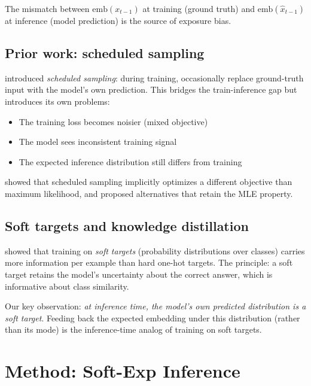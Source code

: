 \documentclass{article}
\begin{document}
The mismatch between $\mathrm{emb}(x_{t-1})$ at training (ground truth) and $\mathrm{emb}(\hat{x}_{t-1})$ at inference (model prediction) is the source of exposure bias.

\subsection{Prior work: scheduled sampling}

\citet{bengio2015scheduled} introduced \emph{scheduled sampling}: during training, occasionally replace ground-truth input with the model's own prediction. This bridges the train-inference gap but introduces its own problems:
\begin{itemize}
    \item The training loss becomes noisier (mixed objective)
    \item The model sees inconsistent training signal
    \item The expected inference distribution still differs from training
\end{itemize}

\citet{huszar2015how} showed that scheduled sampling implicitly optimizes a different objective than maximum likelihood, and proposed alternatives that retain the MLE property.

\subsection{Soft targets and knowledge distillation}

\citet{hinton2015distill} showed that training on \emph{soft targets} (probability distributions over classes) carries more information per example than hard one-hot targets. The principle: a soft target retains the model's uncertainty about the correct answer, which is informative about class similarity.

Our key observation: \emph{at inference time, the model's own predicted distribution is a soft target}. Feeding back the expected embedding under this distribution (rather than its mode) is the inference-time analog of training on soft targets.

\section{Method: Soft-Exp Inference}
\end{document}
